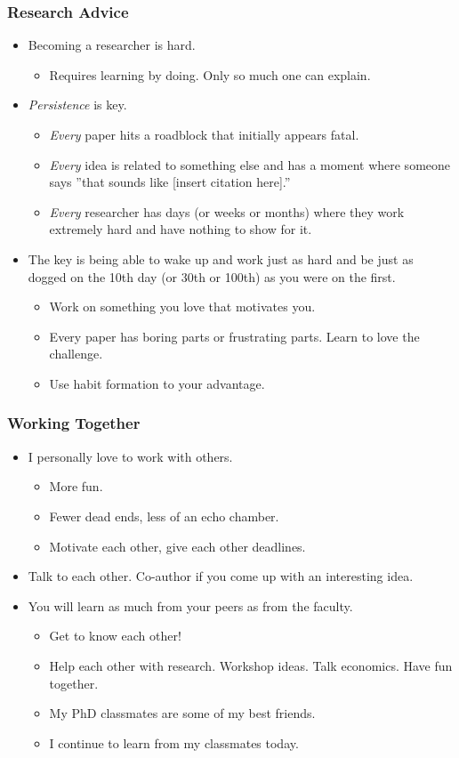 \documentclass[english,xcolor=svgnames]{beamer}
\begin{document}
\begin{frame}
\frametitle[alignment=center]{Research Advice}
\begin{itemize}
	\item Becoming a researcher is hard.
	\begin{itemize}
		\item Requires learning by doing. Only so much one can explain.
	\end{itemize}
	\item \emph{Persistence} is key.
	\begin{itemize}
		\item \emph{Every} paper hits a roadblock that initially appears fatal.
		\item \emph{Every} idea is related to something else and has a moment where someone says ''that sounds like [insert citation here].''
		\item \emph{Every} researcher has days (or weeks or months) where they
work extremely hard and have nothing to show for it.
	\end{itemize}
	\item The key is being able to wake up and work just as hard and be just as dogged on the 10th day (or 30th or 100th) as you were on the first.
	\begin{itemize}
		\item Work on something you love that motivates you.
		\item Every paper has boring parts or frustrating parts. Learn to love
the challenge.
		\item Use habit formation to your advantage.
	\end{itemize}
\end{itemize}
\end{frame}


\begin{frame}
\frametitle[alignment=center]{Working Together}
\begin{itemize}
	\item I personally love to work with others.
	\begin{itemize}
		\item More fun.
		\item Fewer dead ends, less of an echo chamber.
		\item Motivate each other, give each other deadlines.
	\end{itemize}
	\item Talk to each other. Co-author if you come up with an interesting idea.
	\item You will learn as much from your peers as from the faculty.
	\begin{itemize}
		\item Get to know each other!
		\item Help each other with research. Workshop ideas. Talk economics. Have fun together.
		\item My PhD classmates are some of my best friends.
		\item I continue to learn from my classmates today.
	\end{itemize}
\end{itemize}
\end{frame}
\end{document}
